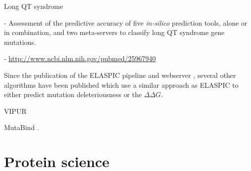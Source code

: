 Long QT syndrome

  - Assessment of the predictive accuracy of five \textit{in-silico} prediction tools, alone or in combination, and two meta-servers to classify long QT syndrome gene mutations.

  - \url{http://www.ncbi.nlm.nih.gov/pubmed/25967940}



Since the publication of the ELASPIC pipeline \cite{berliner_combining_2014} and webserver \cite{witvliet_elaspic_2016}, several other algorithms have been published which use a similar approach as ELASPIC to either predict mutation deleteriousness \cite{baugh_robust_2016} or the $\Delta \Delta G$.




VIPUR \cite{baugh_robust_2016}


MutaBind \cite{li_mutabind_2016}.




\section{Protein science}
